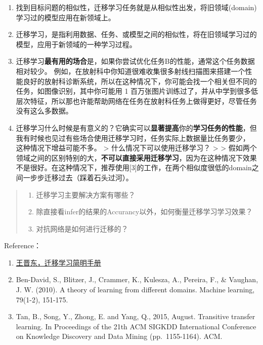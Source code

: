 \begin{enumerate}
\def\labelenumi{\arabic{enumi}.}
\tightlist
\item
  找到目标问题的相似性，迁移学习任务就是从相似性出发，将旧领域(domain)学习过的模型应用在新领域上。
\item
  迁移学习，是指利用数据、任务、或模型之间的相似性，将在旧领域学习过的模型，应用于新领域的一种学习过程。
\item
  迁移学习\textbf{最有用的场合}是，如果你尝试优化任务B的性能，通常这个任务数据相对较少。
  例如，在放射科中你知道很难收集很多射线扫描图来搭建一个性能良好的放射科诊断系统，所以在这种情况下，你可能会找一个相关但不同的任务，如图像识别，其中你可能用
  1
  百万张图片训练过了，并从中学到很多低层次特征，所以那也许能帮助网络在任务在放射科任务上做得更好，尽管任务没有这么多数据。
\item
  迁移学习什么时候是有意义的？它确实可以\textbf{显著提高}你的\textbf{学习任务的性能}，但我有时候也见过有些场合使用迁移学习时，任务实际上数据量比任务要少，
  这种情况下增益可能不多。 \textgreater{} 什么情况下可以使用迁移学习？
  \textgreater{} \textgreater{}
  假如两个领域之间的区别特别的大，\textbf{不可以直接采用迁移学习}，因为在这种情况下效果不是很好。在这种情况下，推荐使用{[}3{]}的工作，在两个相似度很低的domain之间一步步迁移过去（踩着石头过河）。
\end{enumerate}

\begin{quote}
\begin{enumerate}
\def\labelenumi{\arabic{enumi}.}
\tightlist
\item
  迁移学习主要解决方案有哪些？
\item
  除直接看infer的结果的Accurancy以外，如何衡量迁移学习学习效果？
\item
  对抗网络是如何进行迁移的？
\end{enumerate}
\end{quote}

Reference：

\begin{enumerate}
\def\labelenumi{\arabic{enumi}.}
\tightlist
\item
  \href{https：//github.com/jindongwang/transferlearning-tutorial}{王晋东，迁移学习简明手册}
\item
  Ben-David, S., Blitzer, J., Crammer, K., Kulesza, A., Pereira, F., \&
  Vaughan, J. W. (2010). A theory of learning from different domains.
  Machine learning, 79(1-2), 151-175.
\item
  Tan, B., Song, Y., Zhong, E. and Yang, Q., 2015, August. Transitive
  transfer learning. In Proceedings of the 21th ACM SIGKDD International
  Conference on Knowledge Discovery and Data Mining (pp.~1155-1164).
  ACM.
\end{enumerate}

